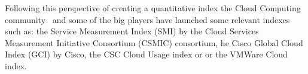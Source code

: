 Following this perspective of creating a quantitative index the Cloud Computing community~\cite{Maiya:2012:QMC:2353730.2353862,DBLP:conf/quatic/KlemsBW12} 
and some of the big players have launched some relevant indexes such as: the Service Measurement Index (SMI) by the Cloud Services 
Measurement Initiative Consortium (CSMIC) consortium, he Cisco Global Cloud Index (GCI) by Cisco, the CSC Cloud Usage index or 
or the VMWare Cloud index.

% 
%  
% 
% 
% 

